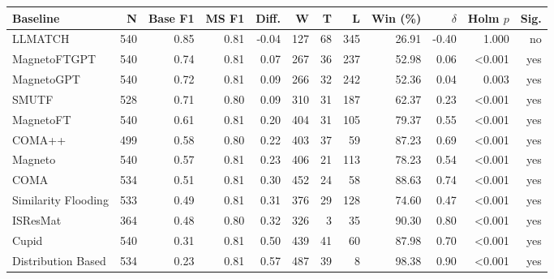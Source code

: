 \begin{tabular}{lrrrrrrrrrrr}
\toprule
Baseline & N & Base F1 & MS F1 & Diff. & W & T & L & Win (\%) & $\delta$ & Holm $p$ & Sig. \\
\midrule
LLMATCH & 540 & 0.85 & 0.81 & -0.04 & 127 & 68 & 345 & 26.91 & -0.40 & 1.000 & no \\
MagnetoFTGPT & 540 & 0.74 & 0.81 & 0.07 & 267 & 36 & 237 & 52.98 & 0.06 & <0.001 & yes \\
MagnetoGPT & 540 & 0.72 & 0.81 & 0.09 & 266 & 32 & 242 & 52.36 & 0.04 & 0.003 & yes \\
SMUTF & 528 & 0.71 & 0.80 & 0.09 & 310 & 31 & 187 & 62.37 & 0.23 & <0.001 & yes \\
MagnetoFT & 540 & 0.61 & 0.81 & 0.20 & 404 & 31 & 105 & 79.37 & 0.55 & <0.001 & yes \\
COMA++ & 499 & 0.58 & 0.80 & 0.22 & 403 & 37 & 59 & 87.23 & 0.69 & <0.001 & yes \\
Magneto & 540 & 0.57 & 0.81 & 0.23 & 406 & 21 & 113 & 78.23 & 0.54 & <0.001 & yes \\
COMA & 534 & 0.51 & 0.81 & 0.30 & 452 & 24 & 58 & 88.63 & 0.74 & <0.001 & yes \\
Similarity Flooding & 533 & 0.49 & 0.81 & 0.31 & 376 & 29 & 128 & 74.60 & 0.47 & <0.001 & yes \\
ISResMat & 364 & 0.48 & 0.80 & 0.32 & 326 & 3 & 35 & 90.30 & 0.80 & <0.001 & yes \\
Cupid & 540 & 0.31 & 0.81 & 0.50 & 439 & 41 & 60 & 87.98 & 0.70 & <0.001 & yes \\
Distribution Based & 534 & 0.23 & 0.81 & 0.57 & 487 & 39 & 8 & 98.38 & 0.90 & <0.001 & yes \\
\bottomrule
\end{tabular}
